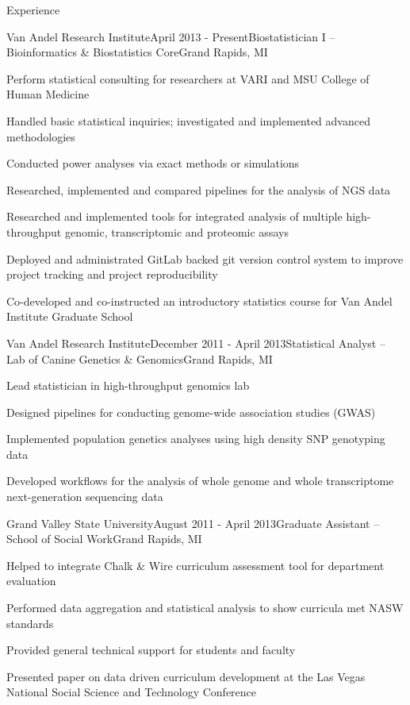 \documentclass{resume} %
\begin{document}
\begin{rSection}{Experience}

\begin{rSubsection}{Van Andel Research Institute}{April 2013 - Present}{Biostatistician I -- Bioinformatics \& Biostatistics Core}{Grand Rapids, MI}
\item Perform statistical consulting for researchers at VARI and MSU College of Human Medicine
\item Handled basic statistical inquiries; investigated and implemented advanced methodologies 
\item Conducted power analyses via exact methods or simulations
\item Researched, implemented and compared pipelines for the analysis of NGS data
\item Researched and implemented tools for integrated analysis of multiple high-throughput genomic, transcriptomic and proteomic assays
\item Deployed and administrated GitLab backed git version control system to improve project tracking and project reproducibility
\item Co-developed and co-instructed an introductory statistics course for Van Andel Institute Graduate School
\end{rSubsection}


\begin{rSubsection}{Van Andel Research Institute}{December 2011 - April 2013}{Statistical Analyst -- Lab of Canine Genetics \& Genomics}{Grand Rapids, MI}
\item Lead statistician in high-throughput genomics lab
\item Designed pipelines for conducting genome-wide association studies (GWAS) 
\item Implemented population genetics analyses using high density SNP genotyping data
\item Developed workflows for the analysis of whole genome and whole transcriptome next-generation sequencing data
\end{rSubsection}


\begin{rSubsection}{Grand Valley State University}{August 2011 - April 2013}{Graduate Assistant -- School of Social Work}{Grand Rapids, MI}
\item Helped to integrate Chalk \& Wire curriculum assessment tool for department evaluation
\item Performed data aggregation and statistical analysis to show curricula met NASW standards
\item Provided general technical support for students and faculty
\item Presented paper on data driven curriculum development at the Las Vegas National Social Science and Technology Conference
\end{rSubsection}

\end{rSection}
\pagebreak
\end{document}
